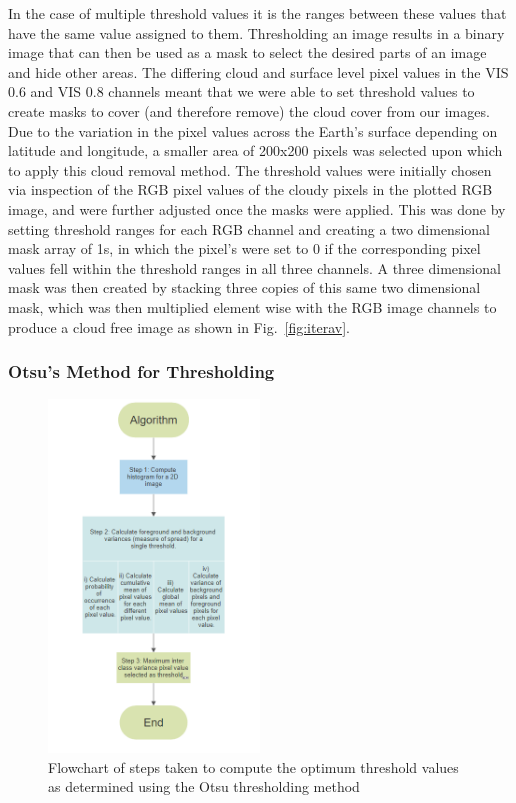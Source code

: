  In the case of multiple threshold values it is the ranges between these values that have the same value assigned to them. Thresholding an image results in a binary image that can then be used as a mask to select the desired parts of an image and hide other areas. The differing cloud and surface level pixel values in the VIS 0.6 and VIS 0.8 channels meant that we were able to set threshold values to create masks to cover (and therefore remove) the cloud cover from our images. Due to the variation in the pixel values across the Earth's surface depending on latitude and longitude, a smaller area of 200x200 pixels was selected upon which to apply this cloud removal method. The threshold values were initially chosen via inspection of the RGB pixel values of the cloudy pixels in the plotted RGB image, and were further adjusted once the masks were applied. This was done by setting threshold ranges for each RGB channel and creating a two dimensional mask array of 1s,  in which the pixel's were set to 0 if the corresponding pixel values fell within the threshold ranges in all three channels. A three dimensional mask was then created by stacking three copies of this same two dimensional mask, which was then multiplied element wise with the RGB image channels to produce a cloud free image as shown in Fig.~\ref{fig:iterav}. 
 
\subsubsection{Otsu's Method for Thresholding}

\begin{figure}
    \includegraphics[width=0.5\textwidth]{flowchart_Otsu.png}
    \caption{\label{fig:flowchart} Flowchart of steps taken to compute the optimum threshold values as determined using the Otsu thresholding method}
\end{figure}

